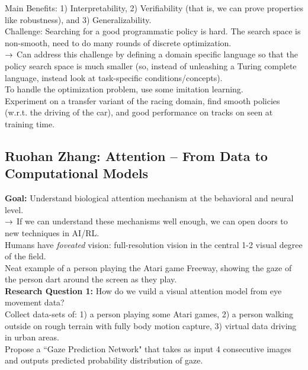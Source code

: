 Main Benefits: 1) Interpretability, 2) Verifiability (that is, we can prove properties like robustness),  and 3) Generalizability. \\

Challenge: Searching for a good programmatic policy is hard. The search space is non-smooth, need to do many rounds of discrete optimization. \\

$\rightarrow$ Can address this challenge by defining a domain specific language so that the policy search space is much smaller (so, instead of unleashing a Turing complete language, instead look at task-specific conditions/concepts). \\

To handle the optimization problem, use some imitation learning. \\

Experiment on a transfer variant of the racing domain, find smooth policies (w.r.t. the driving of the car), and good performance on tracks on seen at training time.

\spacerule
\subsection{Ruohan Zhang: Attention -- From Data to Computational Models}

{\bf Goal:} Understand biological attention mechanism at the behavioral and neural level. \\

$\rightarrow$ If we can understand these mechanisms well enough, we can open doors to new techniques in AI/RL. \\

Humans have {\it foveated} vision: full-resolution vision in the central 1-2 visual degree of the field. \\

Neat example of a person playing the Atari game Freeway, showing the gaze of the person dart around the screen as they play. \\

{\bf Research Question 1:} How do we vuild a visual attention model from eye movement data? \\

Collect data-sets of: 1) a person playing some Atari games, 2) a person walking outside on rough terrain with fully body motion capture, 3) virtual data driving in urban areas. \\

Propose a ``Gaze Prediction Network" that takes as input 4 consecutive images and outputs predicted probability distribution of gaze. \\

